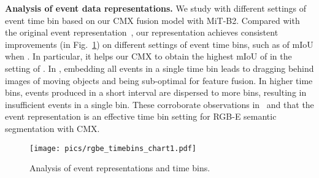 \documentclass[journal]{IEEEtran}
\begin{document}
\noindent\textbf{Analysis of event data representations.}
We study with different settings of event time bin  
based on our CMX fusion model with MiT-B2. Compared with the original event representation~\cite{gehrig2021eventscape_dataset}, our representation achieves consistent improvements (in Fig.~\ref{fig:rgbe_timebins_chart}) on different settings of event time bins, such as  of mIoU when .
In particular, it helps our CMX to obtain the highest mIoU of  in the setting of .
In , embedding all events in a single time bin leads to dragging behind images of moving objects and being sub-optimal for feature fusion.
In higher time bins, events produced in a short interval are dispersed to more bins, resulting in insufficient events in a single bin.
These corroborate observations in~\cite{zhang2021issafe,zhang2021edcnet} and that the event representation  is an effective time bin setting for RGB-E semantic segmentation with CMX.

\begin{figure}[!t]
    \begin{center}
       \texttt{[image: pics/rgbe\_timebins\_chart1.pdf]}
    \end{center}
       \caption{
       Analysis of event representations and time bins.
       } 
    \label{fig:rgbe_timebins_chart}
\end{figure}
\end{document}
